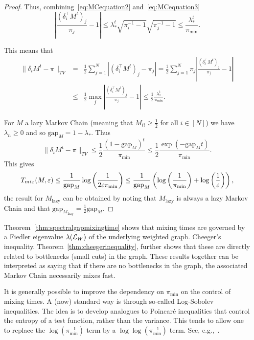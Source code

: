 \begin{proof}
Thus, combining~\eqref{eq:MCequation2} and~\eqref{eq:MCequation3}
\begin{equation}\label{eq:MCequation4}
\left| \frac{\left(\delta_i^\top M^t\right)_j}{\pi_j} - 1 \right| \leq \lambda_\ast^t \sqrt{\pi_i^{-1}-1}\sqrt{\pi_j^{-1}-1}\leq \frac{\lambda_\ast^t}{\pi_{\min}}.
\end{equation}

This means that
\begin{eqnarray*}\label{eq:MCequation5}
 \|\delta_iM^t-\pi\|_{TV} 
 &=& \frac12 \sum_{j=1}^N \left| \left(\delta_i^\top M^t\right)_j - \pi_j \right| 
 = \frac12 \sum_{j=1}^N \pi_j\left|  \frac{\left(\delta_i^\top M^t\right)_j}{\pi_j} - 1\right| \\
 &\leq & \frac12\max_j \left|  \frac{\left(\delta_i^\top M^t\right)_j}{\pi_j} - 1\right| \leq \frac12 \frac{\lambda_\ast^t}{\pi_{\min}}.
\end{eqnarray*}

For $M$ a lazy Markov Chain (meaning that $M_{ii}\geq \frac12$ for all $i\in[N]$) we have $\lambda_n\geq 0$ and so $\mathrm{gap}_M = 1-\lambda_\ast$. Thus
\begin{equation}
\|\delta_iM^t-\pi\|_{TV} \leq \frac12 \frac{(1-\mathrm{gap}_M)^t}{\pi_{\min}}\leq \frac12 \frac{\exp(-\mathrm{gap}_Mt)}{\pi_{\min}}.
\end{equation}
This gives
\[
T_{mix}(M,\varepsilon) \leq \frac1{\mathrm{gap}_M}\log\left(\frac1{2\varepsilon\pi_{\min}}\right)\leq \frac1{\mathrm{gap}_M}
\left(
\log\left(\frac1{\pi_{\min}}\right)+\log\left(\frac1{\varepsilon}\right)
\right),
\]
the result for $M_{\text{lazy}}$ can be obtained by noting that $M_{\text{lazy}}$ is always a lazy Markov Chain and that $\mathrm{gap}_{M_{\text{lazy}}}=\frac12\mathrm{gap}_M$.
\end{proof}

Theorem~\ref{thm:spectralgapmixingtime} shows that mixing times are governed by a Fiedler eigenvalue $\lambda(\mathcal{L}_W)$ of the underlying weighted graph. Cheeger's inequality. Theorem~\ref{thm:cheegerinequality}, further shows that these are directly related to bottlenecks (small cuts) in the graph. These results together can be interpreted as saying that if there are no bottlenecks in the graph, the associated Markov Chain necessarily mixes fast.

It is generally possible to improve the dependency on $\pi_{\min}$ on the control of mixing times. A (now) standard way is through so-called Log-Sobolev inequalities. The idea is to develop analogues to Poincar\'e inequalities that control the entropy of a test function, rather than the variance. This tends to allow one to replace the $\log(\pi_{\min}^{-1})$ term by a $\log\log(\pi_{\min}^{-1})$ term. See, e.g.,~\cite{Diaconisetal-LogSobolev96}.



